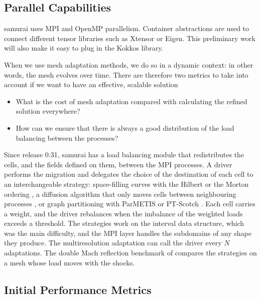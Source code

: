 \subsection{Parallel Capabilities}
\label{sec:WP1:Samurai:performances}

samurai uses MPI and OpenMP parallelism. Container abstractions are used to connect different tensor libraries such as Xtensor or Eigen. This preliminary work will also make it easy to plug in the Kokkos library.

When we use mesh adaptation methods, we do so in a dynamic context: in other words, the mesh evolves over time. There are therefore two metrics to take into account if we want to have an effective, scalable solution
\begin{itemize}
\item What is the cost of mesh adaptation compared with calculating the refined solution everywhere?
\item How can we ensure that there is always a good distribution of the load balancing between the processes?
\end{itemize}

Since release 0.31, samurai has a load balancing module that redistributes the cells, and the fields defined on them, between the MPI processes. A driver performs the migration and delegates the choice of the destination of each cell to an interchangeable strategy: space-filling curves with the Hilbert or the Morton ordering \cite{bader_space-filling_2013}, a diffusion algorithm that only moves cells between neighbouring processes \cite{cybenko_dynamic_1989}, or graph partitioning with ParMETIS \cite{karypis_parallel_1996} or PT-Scotch \cite{chevalier_pt-scotch_2008}. Each cell carries a weight, and the driver rebalances when the imbalance of the weighted loads exceeds a threshold. The strategies work on the interval data structure, which was the main difficulty, and the MPI layer handles the subdomains of any shape they produce. The multiresolution adaptation can call the driver every $N$ adaptations. The double Mach reflection benchmark of  compares the strategies on a mesh whose load moves with the shocks.

\subsection{Initial Performance Metrics}
\label{sec:WP1:Samurai:metrics}

